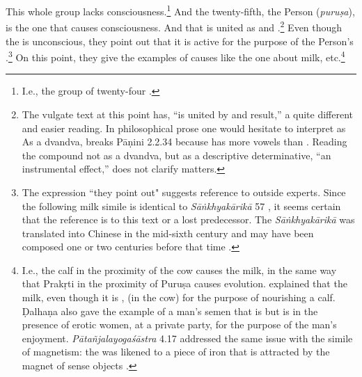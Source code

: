 \begin{translation}
\item[3.1.8]

This whole group lacks consciousness.\footnote{I.e., the group of
    twenty-four .}  And the twenty-fifth, the
    Person (\emph{puruṣa}), is the one that causes
    consciousness.  And that is united as  and
    .\footnote{The vulgate text at this point has, ``is
        united by   and result,'' a quite different and
        easier reading.  In philosophical prose one would hesitate to
        interpret  as  As a dvandva, 
          breaks Pāṇini 2.2.34 because  has more
        vowels than . Reading the compound  not 
        as
        a dvandva, but as a descriptive determinative, ``an instrumental
        effect,'' does not clarify matters.} %
        Even though the  is
        unconscious, they point out that it is active for the purpose
        of the Person's .\footnote{The
            expression ``they point out" suggests reference to outside
            experts.  Since the following milk simile is identical to
            \emph{Sāṅkhyakārikā} 57
            \parencites[184--186]{main-1972}[263]{wezl-1998}, it seems
            certain that the reference is to this text or a lost
            predecessor.  The \emph{Sāṅkhyakārikā} was translated into
            Chinese in the mid-sixth century and may have been composed
            one or two centuries before that time \citep[138]{huli-1978}.}
            On this point, they give the examples of causes like the
            one about milk, etc.\footnote{I.e., the calf  in the
                proximity of the cow causes the milk, in the same way that
                Prakṛti in the proximity of Puruṣa causes evolution.
                 explained that the milk, even though
                it is , 
                (in the cow) for the purpose of nourishing a calf. Ḍalhaṇa
                also gave the example of a man's semen that is
                 but is 
                in the presence of erotic women, at a private party, for
                the purpose of the man's enjoyment.
                \emph{Pātañjalayogaśāstra} 4.17 addressed the same issue
                with the simile of magnetism: the  was
                likened to a piece of iron that is attracted by the magnet
                of sense objects \citep[193]{agas-1904}.}




\end{translation}
